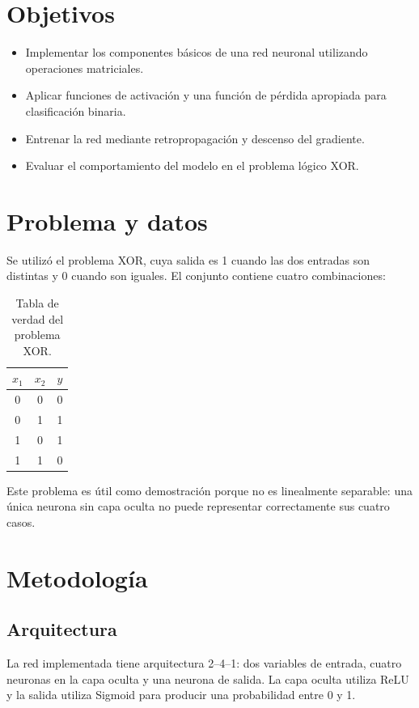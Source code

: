 \documentclass[11pt,a4paper]{article}
\begin{document}
\section{Objetivos}
\begin{itemize}[leftmargin=*]
    \item Implementar los componentes básicos de una red neuronal utilizando operaciones matriciales.
    \item Aplicar funciones de activación y una función de pérdida apropiada para clasificación binaria.
    \item Entrenar la red mediante retropropagación y descenso del gradiente.
    \item Evaluar el comportamiento del modelo en el problema lógico XOR.
\end{itemize}

\section{Problema y datos}
Se utilizó el problema XOR, cuya salida es 1 cuando las dos entradas son distintas y 0 cuando son iguales. El conjunto contiene cuatro combinaciones:

\begin{table}[H]
\centering
\begin{tabular}{cc|c}
\toprule
$x_1$ & $x_2$ & $y$\\
\midrule
0 & 0 & 0\\
0 & 1 & 1\\
1 & 0 & 1\\
1 & 1 & 0\\
\bottomrule
\end{tabular}
\caption{Tabla de verdad del problema XOR.}
\end{table}

Este problema es útil como demostración porque no es linealmente separable: una única neurona sin capa oculta no puede representar correctamente sus cuatro casos.

\section{Metodología}
\subsection{Arquitectura}
La red implementada tiene arquitectura 2--4--1: dos variables de entrada, cuatro neuronas en la capa oculta y una neurona de salida. La capa oculta utiliza ReLU y la salida utiliza Sigmoid para producir una probabilidad entre 0 y 1.
\end{document}
